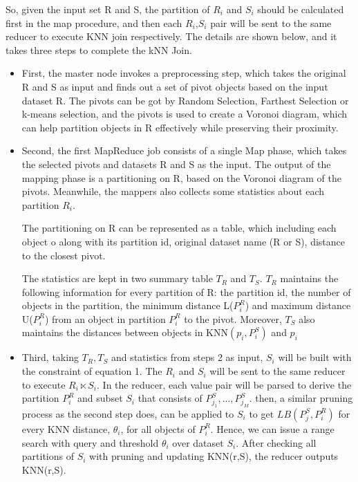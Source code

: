 \documentclass[conference]{IEEEtran}
\begin{document}
	So, given the input set R and S, the partition of $R_i$ and $S_i$ should be calculated first in the map procedure, and then each $R_i$,$S_i$ pair will be sent to the same reducer to execute KNN join respectively.
	The details are shown below, and it takes three steps to complete the kNN Join. 
	\begin{itemize}
		\item First, the master node invokes a preprocessing step, which takes the original R and S as input and finds out a set of pivot objects based on the input dataset R. The pivots can be got by Random Selection, Farthest Selection or k-means selection, and the pivots is used to create a Voronoi diagram, which can help partition objects in R effectively while preserving their proximity. 
		
		\item Second, the first MapReduce job consists of a single Map phase, which takes the selected pivots and datasets R and S as the input. The output of the mapping phase is a partitioning on R, based on the Voronoi diagram of the pivots. Meanwhile, the mappers also collects some statistics about each partition $R_i$.
		
		The partitioning on R can be represented as a table, which including each object o along with its partition id, original dataset name (R or S), distance to the closest pivot.
		
		The statistics are kept in two summary table $T_R$ and $T_S$. $T_R$ maintains the following information for every partition of R: the partition id, the number of objects in the partition, the minimum distance L($P_i^R$) and maximum distance U($P_i^R$) from an object in partition $P_i^R$ to the pivot. Moreover, $T_S$ also maintains the distances between objects in KNN$(p_i,P_i^S)$ and $p_i$ 
		
		\item Third, taking $T_R, T_S$ and statistics from steps 2 as input, $S_i$ will be built with the constraint of equation 1. The $R_i$ and $S_i$ will be sent to the same reducer to execute $R_i \ltimes S_i$.
		In the reducer, each value pair will be parsed to derive the partition $P_i^R$ and subset $S_i$ that consists of $P_{j_1}^S,...,P_{j_M}^S$. 
		then, a similar pruning process as the second step does, can be applied to $S_i$ to get $LB(P_j^S,P_i^R)$ for every KNN distance, $\theta_i$, for all objects of $P_i^R$. Hence, we can issue a range search with query and threshold $\theta_i$ over dataset $S_i$. After checking all partitions of $S_i$ with pruning and updating KNN(r,S), the reducer outputs KNN(r,S).
		
	\end{itemize}
	
\end{document}
